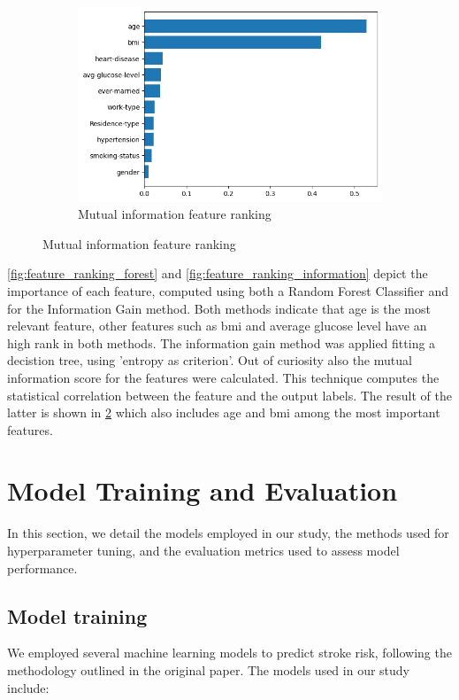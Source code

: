 \documentclass{Configuration_Files/Template}
\begin{document}
\begin{figure}[ht]
    \begin{subfigure}[b]{\linewidth}
    \includegraphics[scale=0.4]{Images/mutual_information_gain.png}
    \caption{Mutual information feature ranking}
    \label{fig:feature_ranking_mutual_info}
    \end{subfigure}
\end{figure}

\ref{fig:feature_ranking_forest} and \ref{fig:feature_ranking_information} depict the importance of each feature, computed using both a Random Forest Classifier and for the Information Gain method. Both methods indicate that age is the most relevant feature, other features such as bmi and average glucose level have an high rank in both methods. The information gain method was applied fitting a decistion tree, using 'entropy as criterion'. Out of curiosity also the mutual information score for the features were calculated. This technique computes the statistical correlation between the feature and the output labels. The result of the latter is shown in \ref{fig:feature_ranking_mutual_info} which also includes age and bmi among the most important features.


\section{Model Training and Evaluation}

In this section, we detail the models employed in our study, the methods used for hyperparameter tuning, and the evaluation metrics used to assess model performance.

\subsection{Model training}
We employed several machine learning models to predict stroke risk, following the methodology outlined in the original paper. The models used in our study include:
\end{document}
